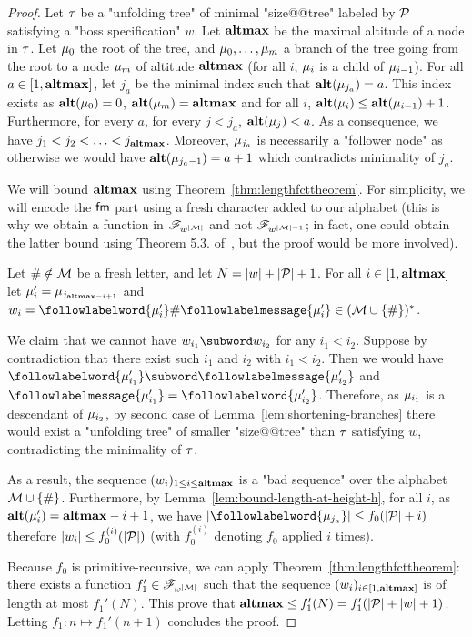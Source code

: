 \begin{proof}
	Let $\tau$ be a "unfolding tree" of minimal "size@@tree" labeled by $\mathcal{P}$ satisfying a "boss specification" $w$. Let $\mathbf{altmax}$ be the maximal altitude of a node in $\tau$. Let $\mu_0$ the root of the tree, and  $\mu_0, \ldots, \mu_m$ a branch of the tree going from the root to a node $\mu_m$ of altitude $\mathbf{altmax}$ (for all $i$, $\mu_i$ is a child of $\mu_{i-1}$).
	For all $a \in [1,\mathbf{altmax}]$, let $j_a$ be the minimal index such that $\mathbf{alt}(\mu_{j_a}) = a$. This index exists as $\mathbf{alt}(\mu_0) = 0$, $\mathbf{alt}(\mu_m) = \mathbf{altmax}$ and for all $i$, $\mathbf{alt}(\mu_{i}) \leq \mathbf{alt}(\mu_{i-1})+1$.
	Furthermore, for every $a$, for every $j < j_a$, $\mathbf{alt}(\mu_j) < a$. 
	As a consequence, we have $j_1 < j_2 < \ldots < j_{\mathbf{altmax}}$. Moreover, $\mu_{j_a}$ is necessarily a "follower node" as otherwise we would have $\mathbf{alt}(\mu_{j_a-1}) = a+1$ which contradicts minimality of $j_a$.
	
	We will bound $\mathbf{altmax}$ using Theorem~\ref{thm:lengthfcttheorem}. For simplicity, we will encode the $\mathsf{fm}$ part using a fresh character added to our alphabet (this is why we obtain a function in $\mathscr{F}_{w^{|\mathcal{M}|}}$ and not $\mathscr{F}_{w^{|\mathcal{M}|-1}}$; in fact, one could obtain the latter bound using Theorem 5.3. of~\cite{SchmitzS2011upperHigman}, but the proof would be more involved).

	Let $\# \notin \mathcal{M}$ be a fresh letter, and let $N = |w| + |\mathcal{P}|+1$. For all $i \in [1,\mathbf{altmax}]$ let $\mu'_i = \mu_{j_{\mathbf{altmax} - i+1}}$ and $w_i = \followlabelword{\node'_{i}} \# \followlabelmessage{\node'_{i}} \in (\messages \cup \set{\#})^*$.
	
	We claim that we cannot have $w_{i_1}\subword w_{i_2}$ for any  $i_1< i_2$.
	Suppose by contradiction that there exist such $i_1$ and $i_2$ with $i_1 < i_2$. Then we would have $\followlabelword{\node'_{i_1}} \subword \followlabelmessage{\node'_{i_2}}$ and $\followlabelmessage{\node'_{i_1}} = \followlabelword{\node'_{i_2}}$.
	Therefore, as $\mu_{i_1}$ is a descendant of $\mu_{i_2}$, by second case of Lemma~\ref{lem:shortening-branches} there would exist a "unfolding tree" of smaller "size@@tree" than $\tau$ satisfying $w$, contradicting the minimality of $\tau$.
	
	As a result, the sequence $(w_i)_{1\leq i \leq \mathbf{altmax}}$ is a "bad sequence" over the alphabet $\mathcal{M}\cup\{\#\}$.
	Furthermore, by Lemma~\ref{lem:bound-length-at-height-h}, for all $i$, as $\mathbf{alt}(\mu'_{i}) = \mathbf{altmax}-i+1$, we have $\size{\followlabelword{\node_{j_a}}} \leq f_0(\size{\prot} + i)$ therefore $|w_i| \leq f_0^{(i)}(|\mathcal{P}|)$ (with $f_0^{(i)}$ denoting $f_0$ applied $i$ times).
	
	Because $f_0$ is primitive-recursive, we can apply Theorem~\ref{thm:lengthfcttheorem}: there exists a function $f_1' \in \mathscr{F}_{\omega^{|\mathcal{M}|}}$ such that the sequence $(w_i)_{i \in [1,\mathbf{altmax}]}$ is of length at most $f_1'(N)$. This prove that $\mathbf{altmax} \leq f_1'(N) = f_1'(|\mathcal{P}| + |w| + 1)$. Letting $f_1 :n \mapsto f_1'(n+1)$ concludes the proof.
\end{proof}


